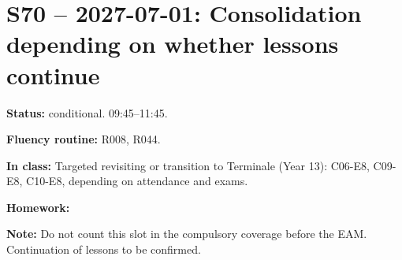 \section*{S70 -- 2027-07-01: Consolidation depending on whether lessons continue}
\textbf{Status:} conditional. 09:45–11:45.\par\textbf{Fluency routine:} R008, R044.\par\textbf{In class:} Targeted revisiting or transition to Terminale (Year 13): C06-E8, C09-E8, C10-E8, depending on attendance and exams.\par\textbf{Homework:} \par\textbf{Note:} Do not count this slot in the compulsory coverage before the EAM. Continuation of lessons to be confirmed.
